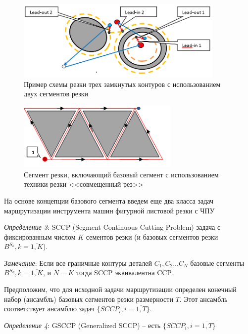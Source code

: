 \documentclass[11pt,twoside]{report}
\newcounter{lem}
\begin{document}
\begin{figure}
  \begin{center}
  \includegraphics[width=0.9\textwidth]{cut2-1.png}
  \caption{Пример схемы резки трех замкнутых контуров с использованием двух сегментов резки}
  \label{cut2-1}
  \end{center}
\end{figure}

\begin{figure}
  \begin{center}
  \includegraphics[width=0.7\textwidth]{cut4-3.png}
  \caption{Сегмент резки, включающий базовый сегмент с использованием техники резки <<совмещенный рез>>}
  \label{cut4-3}
  \end{center}
\end{figure}

На основе концепции базового сегмента введем еще
два класса задач маршрутизации инструмента машин
фигурной листовой резки с ЧПУ

{\it Определение 3}:
SCCP (Segment Continuous Cutting Problem)
задача с фиксированным числом $K$
сементов резки (и базовых сегментов резки
$B^{S_k}, k = \overline{1, K}$).

{\it Замечание}:
Если все граничные контуры деталей
$C_1, C_2 \dots C_N$
базовые сегменты $B^{S_k}, k = \overline{1,K}$,
и $N=K$
тогда SCCP эквивалентна CCP.

Предположим, что для исходной задачи маршрутизации
определен конечный набор (ансамбль)
базовых сегментов резки размерности $T$.
Этот ансамбль соответствует ансамблю задач
$\{SCCP_i, i =\overline{1,T}\}$.

{\it Определение 4}:
GSCCP (Generalized SCCP) -- есть
$\{SCCP_i, i =\overline{1,T}\}$
\end{document}
